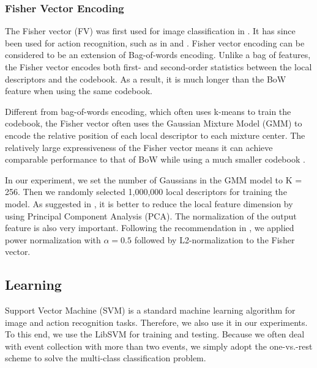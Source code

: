 \subsubsection{Fisher Vector Encoding}
The Fisher vector (FV) was first used for image classification in \cite{jaakkola1999exploiting}. It has since been used for action recognition, such as in \cite{sun2013large} and \cite{wang2013action}. Fisher vector encoding can be considered to be an extension of Bag-of-words encoding. Unlike a bag of features, the Fisher vector encodes both first- and second-order statistics between the local descriptors and the codebook. As a result, it is much longer than the BoW feature when using the same codebook. 

  

Different from bag-of-words encoding, which often uses k-means to train the codebook, the Fisher vector often uses the Gaussian Mixture Model (GMM) to encode the relative position of each local descriptor to each mixture center. The relatively large expressiveness of the Fisher vector means it can achieve comparable performance to that of BoW while using a much smaller codebook \cite{sanchez2013image,sun2013large}.

In our experiment, we set the number of Gaussians in the GMM model to K = 256. Then we randomly selected 1,000,000 local descriptors for training the model. As suggested in \cite{perronnin2010improving}, it is better to reduce the local feature dimension by using Principal Component Analysis (PCA). The normalization of the output feature is also very important. Following the recommendation in \cite{perronnin2010improving}, we applied power normalization with $\alpha=0.5$ followed by L2-normalization to the Fisher vector.


\subsection{Learning}

Support Vector Machine (SVM) is a standard machine learning algorithm for image and action recognition tasks. Therefore, we also use it in our experiments. To this end, we use the LibSVM \cite{chang2011libsvm} for training and testing. Because we often deal with event collection with more than two events, we simply adopt the one-vs.-rest scheme to solve the multi-class classification problem. 


